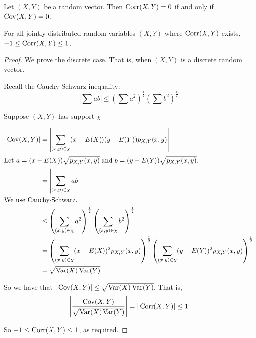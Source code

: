 \begin{theorem}[]
	Let $(X,Y)$ be a random vector. Then $\operatorname{Corr}(X,Y)=0$ if and only if $\operatorname{Cov}(X,Y)=0$.
\end{theorem}

\begin{theorem}[]
	For all jointly distributed random variables $(X,Y)$ where $\operatorname{Corr}(X,Y)$ exists, $-1\leq\operatorname{Corr}(X,Y)\leq 1$.
\end{theorem}

\begin{proof}
	We prove the discrete case. That is, when $(X,Y)$ is a discrete random vector.

	Recall the Cauchy-Schwarz inequality:
	$$\left|\sum ab\right|\leq\left(\sum{a}^2\right)^{\frac 12}\left(\sum{b}^2\right)^{\frac 12}$$

	Suppose $(X,Y)$ has support $\chi$

	\begin{align*}
		|\operatorname{Cov}(X,Y)|&=\left|\sum_{(x,y)\in\chi}(x-E(X))(y-E(Y))p_{X,Y}(x,y)\right|\\
		\intertext{Let $a=(x-E(X))\sqrt{p_{X,Y}(x,y)}$ and $b=(y-E(Y))\sqrt{p_{X,Y}(x,y)}$.}
		&=\left|\sum_{(x,y)\in\chi} ab\right|\\
		\intertext{We use Cauchy-Schwarz.}
		&\leq\left(\sum_{(x,y)\in\chi} a^2\right)^{\frac 12}\left(\sum_{(x,y)\in\chi} b^2\right)^{\frac 12}\\
		&=\left(\sum_{(x,y)\in\chi} (x-E(X))^2p_{X,Y}(x,y)\right)^{\frac 12}\left(\sum_{(x,y)\in\chi} (y-E(Y))^2p_{X,Y}(x,y)\right)^{\frac 12}\\
		&=\sqrt{\operatorname{Var}(X)\operatorname{Var}(Y)}
	\end{align*}

	So we have that $|\operatorname{Cov}(X,Y)|\leq \sqrt{\operatorname{Var}(X)\operatorname{Var}(Y)}$. That is,
	$$\left|\frac{\operatorname{Cov}(X,Y)}{\sqrt{\operatorname{Var}(X)\operatorname{Var}(Y)}}\right|=|\operatorname{Corr}(X,Y)|\leq 1$$

	So $-1\leq\operatorname{Corr}(X,Y)\leq 1$, as required.
\end{proof}

